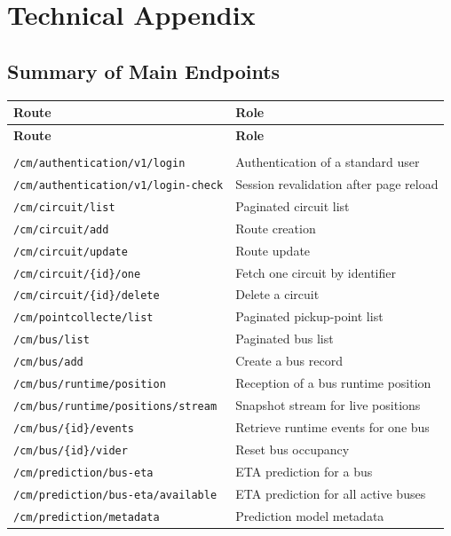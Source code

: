 \appendix
\chapter{Technical Appendix}

\section{Summary of Main Endpoints}

\begin{longtable}{>{\raggedright\arraybackslash}p{6.5cm}p{8cm}}
\toprule
\textbf{Route} & \textbf{Role} \\
\midrule
\endfirsthead
\toprule
\textbf{Route} & \textbf{Role} \\
\midrule
\endhead
\midrule
\multicolumn{2}{r}{Continued on the next page} \\
\endfoot
\bottomrule
\endlastfoot
\texttt{/cm/authentication/v1/login} & Authentication of a standard user \\
\texttt{/cm/authentication/v1/login-check} & Session revalidation after page reload \\
\texttt{/cm/circuit/list} & Paginated circuit list \\
\texttt{/cm/circuit/add} & Route creation \\
\texttt{/cm/circuit/update} & Route update \\
\texttt{/cm/circuit/\{id\}/one} & Fetch one circuit by identifier \\
\texttt{/cm/circuit/\{id\}/delete} & Delete a circuit \\
\texttt{/cm/pointcollecte/list} & Paginated pickup-point list \\
\texttt{/cm/bus/list} & Paginated bus list \\
\texttt{/cm/bus/add} & Create a bus record \\
\texttt{/cm/bus/runtime/position} & Reception of a bus runtime position \\
\texttt{/cm/bus/runtime/positions/stream} & Snapshot stream for live positions \\
\texttt{/cm/bus/\{id\}/events} & Retrieve runtime events for one bus \\
\texttt{/cm/bus/\{id\}/vider} & Reset bus occupancy \\
\texttt{/cm/prediction/bus-eta} & ETA prediction for a bus \\
\texttt{/cm/prediction/bus-eta/available} & ETA prediction for all active buses \\
\texttt{/cm/prediction/metadata} & Prediction model metadata \\

\end{longtable}
